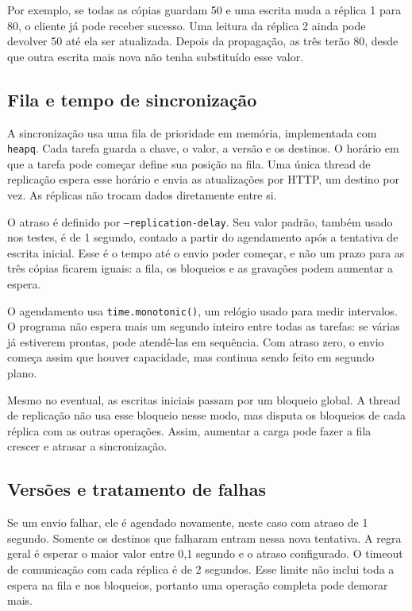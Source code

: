 Por exemplo, se todas as cópias guardam 50 e uma escrita muda a réplica 1
para 80, o cliente já pode receber sucesso. Uma leitura da réplica 2 ainda
pode devolver 50 até ela ser atualizada. Depois da propagação, as três terão
80, desde que outra escrita mais nova não tenha substituído esse valor.

\subsection{Fila e tempo de sincronização}

A sincronização usa uma fila de prioridade em memória, implementada com
\texttt{heapq}. Cada tarefa guarda a chave, o valor, a versão e os destinos.
O horário em que a tarefa pode começar define sua posição na fila. Uma única
thread de replicação espera esse horário e envia as atualizações por HTTP,
um destino por vez. As réplicas não trocam dados diretamente entre si.

O atraso é definido por \texttt{--replication-delay}. Seu valor padrão,
também usado nos testes, é de 1 segundo,
contado a partir do agendamento após a tentativa de escrita inicial.
Esse é o tempo até o envio poder começar, e não um prazo para as três cópias
ficarem iguais: a fila, os bloqueios e as gravações podem aumentar a espera.

O agendamento usa \texttt{time.monotonic()}, um relógio usado para medir
intervalos. O programa não espera mais um segundo inteiro entre todas as
tarefas: se várias já estiverem prontas, pode atendê-las em sequência.
Com atraso zero, o envio começa assim que houver capacidade, mas continua
sendo feito em segundo plano.

Mesmo no eventual, as escritas iniciais passam por um bloqueio global.
A thread de replicação não usa esse bloqueio nesse modo, mas disputa os
bloqueios de cada réplica com as outras operações. Assim, aumentar a carga
pode fazer a fila crescer e atrasar a sincronização.

\subsection{Versões e tratamento de falhas}

Se um envio falhar, ele é agendado novamente, neste caso com atraso de
1 segundo. Somente os destinos que falharam entram nessa nova tentativa.
A regra geral é esperar o maior valor entre 0,1 segundo e o atraso configurado.
O timeout de comunicação com cada réplica é de 2 segundos. Esse limite não
inclui toda a espera na fila e nos bloqueios, portanto uma operação completa
pode demorar mais.

